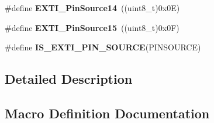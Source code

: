 \begin{DoxyCompactItemize}
\item 
\hypertarget{group___s_y_s_c_f_g___e_x_t_i___pin___sources_gadf2623bff33cc8e7697fdb2641998b22}{}\#define {\bfseries E\+X\+T\+I\+\_\+\+Pin\+Source14}~((uint8\+\_\+t)0x0\+E)\label{group___s_y_s_c_f_g___e_x_t_i___pin___sources_gadf2623bff33cc8e7697fdb2641998b22}

\item 
\hypertarget{group___s_y_s_c_f_g___e_x_t_i___pin___sources_gace55270207b97b533ac87ab0a7047857}{}\#define {\bfseries E\+X\+T\+I\+\_\+\+Pin\+Source15}~((uint8\+\_\+t)0x0\+F)\label{group___s_y_s_c_f_g___e_x_t_i___pin___sources_gace55270207b97b533ac87ab0a7047857}

\item 
\#define {\bfseries I\+S\+\_\+\+E\+X\+T\+I\+\_\+\+P\+I\+N\+\_\+\+S\+O\+U\+R\+C\+E}(P\+I\+N\+S\+O\+U\+R\+C\+E)
\end{DoxyCompactItemize}


\subsection{Detailed Description}


\subsection{Macro Definition Documentation}
\hypertarget{group___s_y_s_c_f_g___e_x_t_i___pin___sources_ga8d63ba3b1a3f9d69c8539304431793c1}{}

